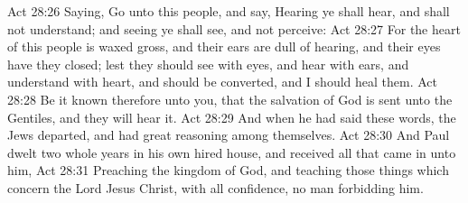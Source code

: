 \vs Act 28:26 Saying, Go unto this people, and say, Hearing ye shall hear, and shall not understand; and seeing ye shall see, and not perceive:
\vs Act 28:27 For the heart of this people is waxed gross, and their ears are dull of hearing, and their eyes have they closed; lest they should see with  eyes, and hear with  ears, and understand with  heart, and should be converted, and I should heal them.
\vs Act 28:28 Be it known therefore unto you, that the salvation of God is sent unto the Gentiles, and  they will hear it.
\vs Act 28:29 And when he had said these words, the Jews departed, and had great reasoning among themselves.
\vs Act 28:30 And Paul dwelt two whole years in his own hired house, and received all that came in unto him,
\vs Act 28:31 Preaching the kingdom of God, and teaching those things which concern the Lord Jesus Christ, with all confidence, no man forbidding him.

